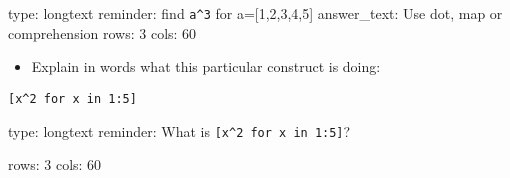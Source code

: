 \documentclass[12pt]{article}
\begin{document}
\begin{answer}
type: longtext
reminder: find \verb+a^3+ for a=[1,2,3,4,5]
answer_text: Use dot, map or comprehension 
rows: 3
cols: 60
\end{answer}

\begin{itemize}
\itemsep1pt\parskip0pt
\item
  Explain in words what this particular construct is doing:
\end{itemize}



\begin{verbatim}
[x^2 for x in 1:5]
\end{verbatim}
\begin{answer}
type: longtext
reminder: What is \verb+[x^2 for x in 1:5]+?

rows: 3
cols: 60
\end{answer}
\end{document}
